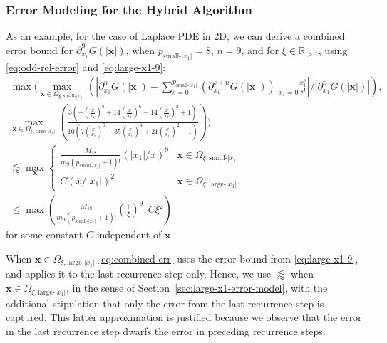 \documentclass[12pt]{article}
\def\R{{\mathbb R}}
\let\b=\boldsymbol
\theoremstyle{definition}
\theoremstyle{plain}
\theoremstyle{definition}
\begin{document}
\subsubsection{Error Modeling for the Hybrid Algorithm}
\label{sec:hybrid-error}
As an example, for the case of Laplace PDE in 2D, we can derive a combined error bound for $\partial^9_{x_1} G(|\b{x}|)$, when $p_{\text{small-$|x_1|$}} = 8$, $n =9$, and for $\xi \in \R_{>1}$, using \eqref{eq:odd-rel-error} and \eqref{eq:large-x1-9}:
\begin{equation}
\label{eq:combined-err}
\begin{aligned}
\max\Bigg( \max_{\b{x} \in \Omega_{\xi,\text{small-$|x_1|$}}} \left(\left|\partial^n_{x_1} G(|\b{x}|) - \sum_{s=0}^{p_{\text{small-$|x_1|$}}} \left( \partial^{s+n}_{x_1} G(|\b{x}|) \right)|_{x_1=0} \frac{x_1^s}{s!} \right| / \left| \partial^n_{x_1} G(|\b{x}|)  \right|\right), \\
\max_{\b{x} \in \Omega_{\xi,\text{large-$|x_1|$}}} \left(\frac{3(-\left(\frac{\overline{x}}{x_1}\right)^8+14\left(\frac{\overline{x}}{x_1}\right)^6-14\left(\frac{\overline{x}}{x_1}\right)^2+1)}{10(7\left(\frac{\overline{x}}{x_1}\right)^6-35\left(\frac{\overline{x}}{x_1}\right)^4+21\left(\frac{\overline{x}}{x_1}\right)^2-1)}
\right) \Bigg) \\
\lessapprox  \max_{\b{x}}
\begin{cases} 
      \frac{M_{18}}{m_{9}(p_{\text{small-$|x_1|$}}+1)!} \left({|x_1|/\overline{x}}\right)^9  & \b{x} \in \Omega_{\xi,\text{small-$|x_1|$}}    \\
      C\left(\overline{x}/|x_1| \right)^2 & \b{x} \in  \Omega_{\xi,\text{large-$|x_1|$}}. 
   \end{cases}
\\
\leq \max\left(\frac{M_{18}}{m_{9}(p_{\text{small-$|x_1|$}}+1)!}\left(\frac{1}{\xi}\right)^9, C\xi^2 \right)
\end{aligned}
\end{equation}
for some constant $C$ independent of $\b x$.

When $\b{x} \in  \Omega_{\xi,\text{large-$|x_1|$}}$ \eqref{eq:combined-err} uses the error bound from \eqref{eq:large-x1-9}, and applies it to the last recurrence step only. Hence, we use $\lessapprox$ when $\b{x} \in \Omega_{\xi,\text{large-$|x_1|$}}$, in the sense of Section~\ref{sec:large-x1-error-model}, with the additional stipulation that only the error from the last recurrence step is captured. This latter approximation is justified because we observe that the error in the last recurrence step dwarfs the error in preceding recurrence steps.
\end{document}
